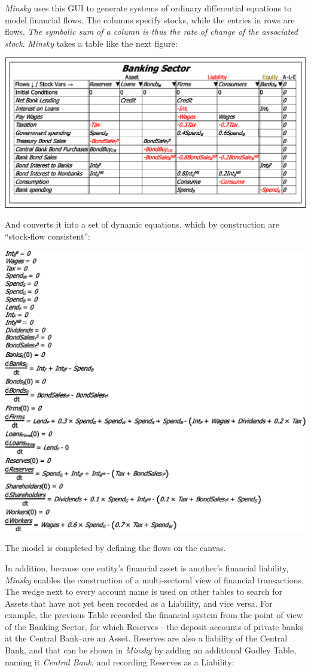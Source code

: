 \emph{Minsky} uses this GUI to generate systems of ordinary differential
equations to model financial flows. The columns specify stocks, while
the entries in rows are flows. \emph{The symbolic sum of a column
is thus the rate of change of the associated stock}. \emph{Minsky}
takes a table like the next figure:

\includegraphics[width=15cm]{images/GodleyTableSingle}

And converts it into a set of dynamic equations, which by construction
are ``stock-flow consistent'':

\includegraphics{images/GodleyTableSingleEquations}

The model is completed by defining the flows on the canvas.

In addition, because one entity's financial asset is another's financial
liability, \emph{Minsky} enables the construction of a multi-sectoral
view of financial transactions. The wedge next to every account name
is used on other tables to search for Assets that have not yet been
recorded as a Liability, and vice versa. For example, the previous
Table recorded the financial system from the point of view of the
Banking Sector, for which Reserves---the deposit accounts of private
banks at the Central Bank--are an Asset. Reserves are also a liability
of the Central Bank, and that can be shown in \emph{Minsky} by adding
an additional Godley Table, naming it \emph{Central Bank}, and recording
Reserves as a Liability:

